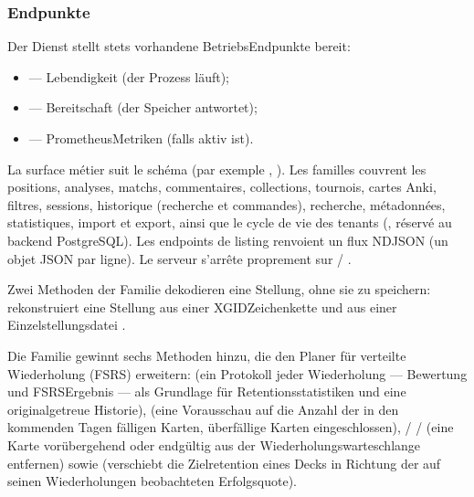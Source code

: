 \documentclass[letterpaper,10pt,german]{sphinxmanual}
\begin{document}
\subsubsection{Endpunkte}
\label{\detokenize{mode_headless:points-d-acces}}
\sphinxAtStartPar
Der Dienst stellt stets vorhandene Betriebs\sphinxhyphen{}Endpunkte bereit:
\begin{itemize}
\item {} 
\sphinxAtStartPar
{} — Lebendigkeit (der Prozess läuft);

\item {} 
\sphinxAtStartPar
{} — Bereitschaft (der Speicher antwortet);

\item {} 
\sphinxAtStartPar
{} — Prometheus\sphinxhyphen{}Metriken (falls  aktiv ist).

\end{itemize}

\sphinxAtStartPar
La surface métier suit le schéma  (par exemple
, ). Les familles couvrent les
positions, analyses, matchs, commentaires, collections, tournois, cartes Anki,
filtres, sessions, historique (recherche et commandes), recherche,
métadonnées, statistiques, import et export, ainsi que le cycle de vie des
tenants (, réservé au backend PostgreSQL). Les endpoints de
listing renvoient un flux NDJSON (un objet JSON par ligne). Le serveur
s’arrête proprement sur  / .

\sphinxAtStartPar
Zwei Methoden der \sphinxhyphen{}Familie dekodieren eine Stellung, ohne sie zu speichern:  rekonstruiert eine Stellung aus einer XGID\sphinxhyphen{}Zeichenkette und  aus einer Einzelstellungsdatei .

\sphinxAtStartPar
Die Familie  gewinnt sechs Methoden hinzu, die den Planer für verteilte Wiederholung (FSRS) erweitern:  (ein Protokoll jeder Wiederholung — Bewertung und FSRS\sphinxhyphen{}Ergebnis — als Grundlage für Retentionsstatistiken und eine originalgetreue Historie),  (eine Vorausschau auf die Anzahl der in den kommenden Tagen fälligen Karten, überfällige Karten eingeschlossen),  /  /  (eine Karte vorübergehend oder endgültig aus der Wiederholungswarteschlange entfernen) sowie  (verschiebt die Zielretention eines Decks in Richtung der auf seinen Wiederholungen beobachteten Erfolgsquote).
\end{document}

